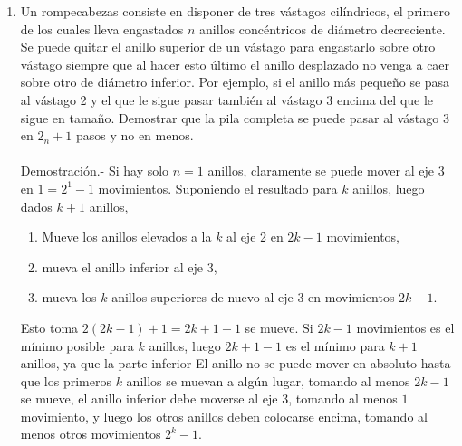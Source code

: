 \begin{enumerate}
       \item Un rompecabezas consiste en disponer de tres vástagos cilíndricos, el primero de los cuales lleva engastados $n$ anillos concéntricos de diámetro decreciente. Se puede quitar el anillo superior de un vástago para engastarlo sobre otro vástago siempre que al hacer esto último el anillo desplazado no venga a caer sobre otro de diámetro inferior. Por ejemplo, si el anillo más pequeño se pasa al vástago 2 y el que le sigue pasar también al vástago 3 encima del que le sigue en tamaño. Demostrar que la pila completa se puede pasar al vástago 3 en $2_n+1$ pasos  y no en menos.\\\\
          Demostración.-\; Si hay solo $n=1$ anillos, claramente se puede mover al eje $3$ en $1=2^1 - 1$ movimientos. Suponiendo el resultado para $k$ anillos, luego dados $k+1$ anillos,
	  \begin{enumerate}[\bfseries (a)]
	  	\item Mueve los anillos elevados a la $k$ al eje 2 en $2k-1$ movimientos,
		\item mueva el anillo inferior al eje 3,
		\item mueva los $k$ anillos superiores de nuevo al eje $3$ en movimientos $2k-1$.
	  \end{enumerate}
	Esto toma $2(2k - 1) + 1 = 2k + 1 - 1$ se mueve. Si $2k - 1$ movimientos es el mínimo posible para $k$ anillos, luego $2k + 1- 1$ es el mínimo para $k + 1$ anillos, ya que la parte inferior El anillo no se puede mover en absoluto hasta que los primeros $k$ anillos se muevan a algún lugar, tomando al menos $2k - 1$ se mueve, el anillo inferior debe moverse al eje $3$, tomando al menos $1$ movimiento, y luego los otros anillos deben colocarse encima, tomando al menos otros movimientos $2^k  - 1$.\\\\


\end{enumerate}
